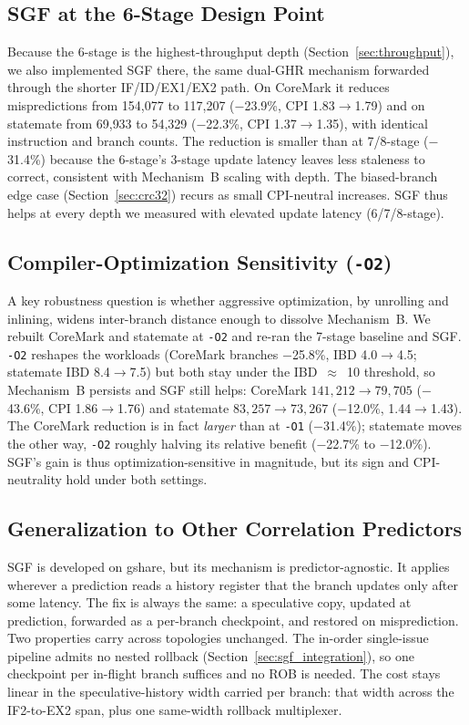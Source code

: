 \documentclass[acmsmall,nonacm,screen]{acmart}
\begin{document}
\subsection{SGF at the 6-Stage Design Point}
\label{sec:sgf_6stage}

Because the 6-stage is the highest-throughput depth (Section~\ref{sec:throughput}), we also implemented SGF there, the same dual-GHR mechanism forwarded through the shorter IF/ID/EX1/EX2 path. On CoreMark it reduces mispredictions from 154{,}077 to 117{,}207 ($-$23.9\%, CPI 1.83$\to$1.79) and on statemate from 69{,}933 to 54{,}329 ($-$22.3\%, CPI 1.37$\to$1.35), with identical instruction and branch counts.
The reduction is smaller than at 7/8-stage ($-$31.4\%) because the 6-stage's 3-stage update latency leaves less staleness to correct, consistent with Mechanism~B scaling with depth. The biased-branch edge case (Section~\ref{sec:crc32}) recurs as small CPI-neutral increases. SGF thus helps at every depth we measured with elevated update latency (6/7/8-stage).

\subsection{Compiler-Optimization Sensitivity (\texttt{-O2})}
\label{sec:o2}
A key robustness question is whether aggressive optimization, by unrolling and inlining, widens inter-branch distance enough to dissolve Mechanism~B. We rebuilt CoreMark and statemate at \texttt{-O2} and re-ran the 7-stage baseline and SGF.
\texttt{-O2} reshapes the workloads (CoreMark branches $-$25.8\%, IBD 4.0$\to$4.5; statemate IBD 8.4$\to$7.5) but both stay under the IBD~$\approx$~10 threshold, so Mechanism~B persists and SGF still helps: CoreMark $141{,}212\to79{,}705$ ($-$43.6\%, CPI 1.86$\to$1.76) and statemate $83{,}257\to73{,}267$ ($-$12.0\%, 1.44$\to$1.43).
The CoreMark reduction is in fact \emph{larger} than at \texttt{-O1} ($-$31.4\%); statemate moves the other way, \texttt{-O2} roughly halving its relative benefit ($-$22.7\% to $-$12.0\%). SGF's gain is thus optimization-sensitive in magnitude, but its sign and CPI-neutrality hold under both settings.

\subsection{Generalization to Other Correlation Predictors}
\label{sec:generalization}
SGF is developed on gshare, but its mechanism is predictor-agnostic. It applies wherever a prediction reads a history register that the branch updates only after some latency. The fix is always the same: a speculative copy, updated at prediction, forwarded as a per-branch checkpoint, and restored on misprediction. Two properties carry across topologies unchanged. The in-order single-issue pipeline admits no nested rollback (Section~\ref{sec:sgf_integration}), so one checkpoint per in-flight branch suffices and no ROB is needed. The cost stays linear in the speculative-history width carried per branch: that width across the IF2-to-EX2 span, plus one same-width rollback multiplexer.
\end{document}
